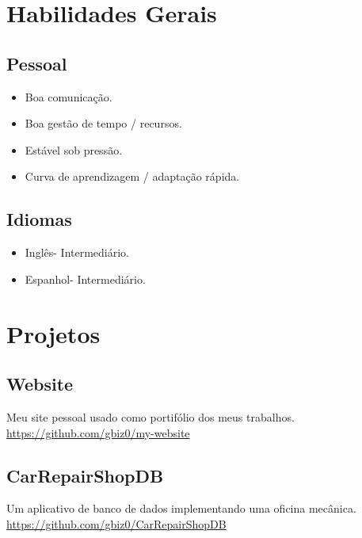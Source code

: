 \documentclass[16pt]{article}
\begin{document}
  \section{Habilidades Gerais}
    \begin{minipage}[t]{0.47\linewidth}
      \subsection{Pessoal}
        \begin{itemize}
          \item{Boa comunicação.}
          \item{Boa gestão de tempo / recursos.}
          \item{Estável sob pressão.}
          \item{Curva de aprendizagem / adaptação rápida.}
        \end{itemize}
    \end{minipage}
    \hfill\vline\hfill
    \begin{minipage}[t]{0.5\linewidth}
      \subsection{Idiomas}
        \begin{itemize}
          \item{Inglês\hspace{2em}- Intermediário.}
          \item{Espanhol\hspace{1.84em}- Intermediário.}
        \end{itemize}
    \end{minipage}
  \section{Projetos}
    \begin{minipage}[t]{0.47\linewidth}
      \subsection{Website}
        Meu site pessoal usado como portifólio dos meus trabalhos.\\

        \url{https://github.com/gbiz0/my-website}\\
    \end{minipage}
    
    \hfill\vline\hfill
    \begin{minipage}[t]{0.5\linewidth}
      \subsection{CarRepairShopDB}
        Um aplicativo de banco de dados implementando uma oficina mecânica.\\

        \url{https://github.com/gbiz0/CarRepairShopDB}\\

    \end{minipage}
    
\end{document}
